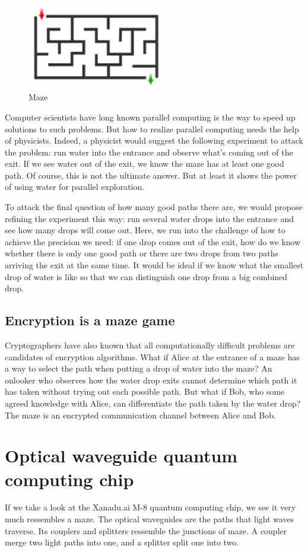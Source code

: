 \documentclass{book}
\begin{document}
\begin{figure}[ht]
\includegraphics[width=6cm]{pic/maze.png}
\caption{Maze}
\label{Maze}
\end{figure}

Computer scientists have long known parallel computing is the way to speed up solutions to such problems. But how to realize parallel computing needs the help of physicists. Indeed, a physicist would suggest the following experiment to attack the problem: run water into the entrance and observe what's coming out of the exit. If we see water out of the exit, we know the maze has at least one good path. Of course, this is not the ultimate answer. But at least it shows the power of using water for parallel exploration.

To attack the final question of how many good paths there are, we would propose refining the experiment this way: run several water drops into the entrance and see how many drops will come out. Here, we run into the challenge of how to achieve the precision we need: if one drop comes out of the exit, how do we know whether there is only one good path or there are two drops from two paths arriving the exit at the same time. It would be ideal if we know what the smallest drop of water is like so that we can distinguish one drop from a big combined drop.

\subsection{Encryption is a maze game}
Cryptographers have also known that all computationally difficult problems are candidates of encryption algorithms. What if Alice at the entrance of a maze has a way to select the path when putting a drop of water into the maze?  An onlooker who observes how the water drop exits cannot determine which path it has taken without trying out each possible path. But what if Bob, who some agreed knowledge with Alice, can differentiate the path taken by the water drop? The maze is an encrypted communication channel between Alice and Bob.

\section{Optical waveguide quantum computing chip}
If we take a look at the Xanadu.ai M-8 quantum computing chip, we see it very much ressembles a maze. The optical waveguides are the paths that light waves traverse. Its couplers and splitters ressemble the junctions of maze. A coupler merge two light paths into one, and a splitter split one into two.
\end{document}
